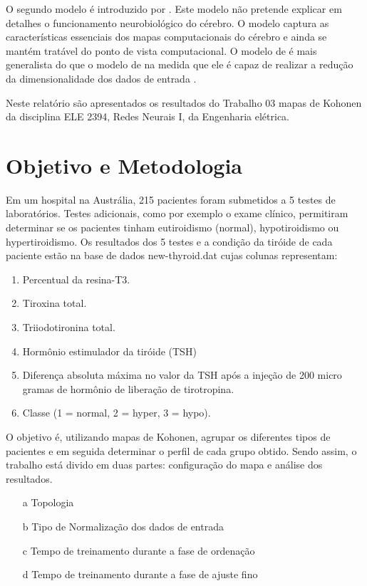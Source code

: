 \documentclass[journal, a4paper]{IEEEtran}
\begin{document}
	O segundo modelo é introduzido por \citet{Kohonen1989}. Este modelo não pretende explicar em detalhes o funcionamento neurobiológico do cérebro. O modelo captura as características essenciais dos mapas computacionais do cérebro e ainda se mantém tratável do ponto de vista computacional.  O modelo de \citet{Kohonen1989} é mais generalista do que o modelo de \citet{Malsburg1976} na medida que ele é capaz de realizar a redução da dimensionalidade dos dados de entrada \citep{Haykin1999}.

	
	Neste relatório são apresentados os resultados do Trabalho 03 mapas de Kohonen da disciplina ELE 2394, Redes Neurais I, da Engenharia elétrica.
	

\section{Objetivo e Metodologia}


Em um hospital na Austrália, 215 pacientes foram submetidos a 5 testes de laboratórios. Testes adicionais, como por exemplo o exame clínico, permitiram determinar se os pacientes tinham eutiroidismo (normal), hypotiroidismo ou hypertiroidismo. Os resultados dos 5 testes e a condição da tiróide de cada paciente estão na base de dados new-thyroid.dat cujas colunas representam:

\begin{enumerate}
\item Percentual da resina-T3.
\item Tiroxina total.
\item Triiodotironina total.
\item Hormônio estimulador da tiróide (TSH)
\item  Diferença absoluta máxima no valor da TSH após a injeção de 200 micro gramas de hormônio de liberação de tirotropina.  
\item Classe (1 = normal, 2 = hyper, 3 = hypo).
\end{enumerate}


O objetivo é, utilizando mapas de Kohonen, agrupar os diferentes tipos de pacientes e em seguida determinar o perfil de cada grupo obtido. Sendo assim, o trabalho está divido em duas partes: configuração do mapa e análise dos resultados.

\begin{itemize}[Configuração do mapa:]
\item[a] Topologia
\item[b] Tipo de Normalização dos dados de entrada
\item[c] Tempo de treinamento durante a fase de ordenação
\item[d] Tempo de treinamento durante a fase de ajuste fino
\end{itemize}
\end{document}
